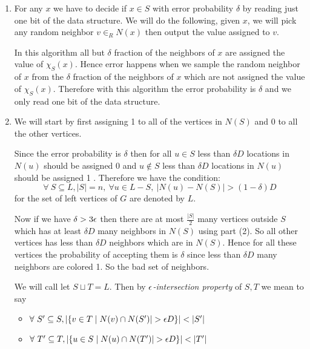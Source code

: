 \documentclass[a4paper, 11pt]{article}
\begin{document}
{\begin{enumerate}
	
	
	\item For any $x$ we have to decide if $x\in S$ with error probability $\delta$ by reading just one bit of the data structure. We will do the following, given $x$, we will pick any random neighbor $v\in_R N(x)$ then output the value assigned to $v$.
	
	In this algorithm all but $\delta$ fraction of the neighbors of $x$ are assigned the value of $\chi_S(x)$. Hence error happens when we sample the random neighbor of $x$ from the $\delta$ fraction of the neighbors of $x$ which are not assigned the value of $\chi_S(x)$. Therefore with this algorithm the error probability is $\delta $ and we only read one bit of the data structure.
	
	\item We will start by first assigning 1 to all of the vertices in $N(S)$ and 0 to all the other vertices.\parinn
	
	Since the error probability is $\delta$ then for all $u\in S$ less than $\delta D$ locations in $N(u)$ should be assigned 0 and  $u\notin S$ less than $\delta D$ locations in $N(u)$ should be assigned 1 . Therefore we have the condition:$$ \forall\ S\subseteq L,|S|=n,\ \forall u\in L-S,\ |N(u)-N(S)|>(1-\delta)D$$for the set of left vertices of $G$ are denoted by $L$.  
	
	 Now if we have $\delta > 3\epsilon$ then there are at most $\frac{|S|}2$ many vertices outside $S$ which has at least $\delta D$ many neighbors in $N(S)$  using part (2). So all other vertices has less than $\delta D$ neighbors which are in $N(S)$. Hence for all these vertices the probability of accepting them is $\delta $ since less than $\delta D$ many neighbors are colored 1. So the bad set of neighbors.
	 
	 We will call let $S\sqcup T=L$. Then  by $\epsilon$\textit{-intersection property} of $S,T$ we mean to say \begin{itemize}
	 	\item $\forall\ S'\subseteq S, |\{v\in T\mid N(v)\cap N(S')|>\eps D\}|< |S'|$
	 	\item $\forall\ T'\subseteq T, |\{u\in S\mid N(u)\cap N(T')|>\eps D\}|< |T'|$
	 \end{itemize}
\end{enumerate}
}
\pagebreak

\end{document}

